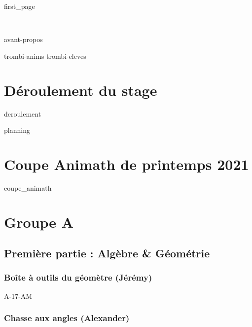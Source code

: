 \documentclass[poly,trombi]{valbonne}
\begin{document}
{first_page}

\pagestyle{empty}~

\pagebreak

\clearpage

{avant-propos}

\pagestyle{plain}

\footnotesize
\pagestyle{trombi}
{trombi-anims}
\newpage
{trombi-eleves}


\normalsize

\pagestyle{empty}

\renewcommand{\headrulewidth}{0.4pt}

\tableofcontents

\chapter{Déroulement du stage}
\pagestyle{plain}

{deroulement}

{planning}

\chapter{Coupe Animath de printemps 2021}

{coupe_animath}






\chapter{Groupe A}

\minitoc \clearpage

\section{Première partie : Algèbre \& Géométrie}

\subsection{Boîte à outils du géomètre (Jérémy)}

{A-17-AM}

\subsection{Chasse aux angles (Alexander)}
\end{document}
